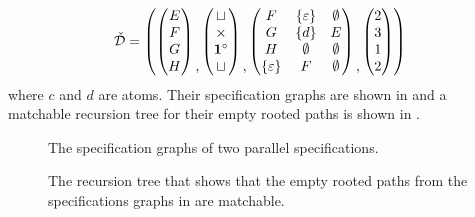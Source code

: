 \[
    \check{\mathcal{D}} = \left(
        \begin{pmatrix}
            E\\F\\G\\H
        \end{pmatrix}
        \begin{matrix}\\\\\\,\end{matrix}
        \begin{pmatrix}
            \sqcup\\\times\\\mathbf{1}^\circ\\\sqcup
        \end{pmatrix}
        \begin{matrix}\\\\\\,\end{matrix}
        \begin{pmatrix}
            F & \left\{\varepsilon\right\} & \emptyset\\
            G & \left\{d\right\} & E\\
            H & \emptyset & \emptyset\\
            \left\{\varepsilon\right\} & F & \emptyset
        \end{pmatrix}
        \begin{matrix}\\\\\\,\end{matrix}
        \begin{pmatrix}
            2\\3\\1\\2
        \end{pmatrix}
    \right)
\]
where $c$ and $d$ are atoms. Their specification graphs are shown in  and a matchable recursion tree for their empty rooted paths is shown in .
\begin{figure}[htbp]
    \centering
    
    \caption{The specification graphs of two parallel specifications.}
    \label{fig:para_spec}
\end{figure}
\begin{figure}[ht!]
    \centering
    
    \caption{The recursion tree that shows that the empty rooted paths from the specifications graphs in  are matchable.}
    \label{fig:para_spec_rec}
\end{figure}

